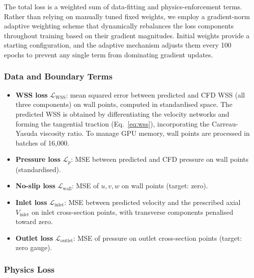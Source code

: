 \documentclass[11pt,a4paper]{article}
\begin{document}
The total loss is a weighted sum of data-fitting and physics-enforcement terms. Rather than relying on manually tuned fixed weights, we employ a gradient-norm adaptive weighting scheme that dynamically rebalances the loss components throughout training based on their gradient magnitudes. Initial weights provide a starting configuration, and the adaptive mechanism adjusts them every 100 epochs to prevent any single term from dominating gradient updates.

\subsubsection{Data and Boundary Terms}

\begin{itemize}
\item \textbf{WSS loss} $\mathcal{L}_{\text{WSS}}$: mean squared error between predicted and CFD WSS (all three components) on wall points, computed in standardised space. The predicted WSS is obtained by differentiating the velocity networks and forming the tangential traction (Eq.~\ref{eq:wss}), incorporating the Carreau-Yasuda viscosity ratio. To manage GPU memory, wall points are processed in batches of 16{,}000.
\item \textbf{Pressure loss} $\mathcal{L}_p$: MSE between predicted and CFD pressure on wall points (standardised).
\item \textbf{No-slip loss} $\mathcal{L}_{\text{wall}}$: MSE of $u,v,w$ on wall points (target: zero).
\item \textbf{Inlet loss} $\mathcal{L}_{\text{inlet}}$: MSE between predicted velocity and the prescribed axial $V_{\text{inlet}}$ on inlet cross-section points, with transverse components penalised toward zero.
\item \textbf{Outlet loss} $\mathcal{L}_{\text{outlet}}$: MSE of pressure on outlet cross-section points (target: zero gauge).
\end{itemize}

\subsubsection{Physics Loss}
\end{document}
